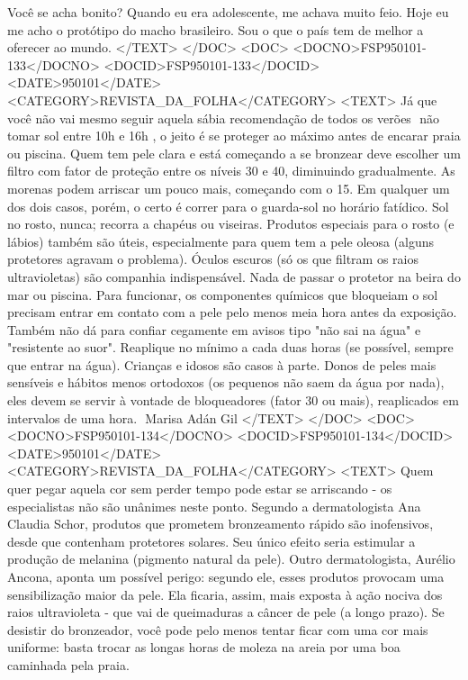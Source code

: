 Você se acha bonito?
Quando eu era adolescente, me achava muito feio. Hoje eu me acho o protótipo do macho brasileiro. Sou o que o país tem de melhor a oferecer ao mundo.
</TEXT>
</DOC>
<DOC>
<DOCNO>FSP950101-133</DOCNO>
<DOCID>FSP950101-133</DOCID>
<DATE>950101</DATE>
<CATEGORY>REVISTA_DA_FOLHA</CATEGORY>
<TEXT>
Já que você não vai mesmo seguir aquela sábia recomendação de todos os verões  não tomar sol entre 10h e 16h , o jeito é se proteger ao máximo antes de encarar praia ou piscina.
Quem tem pele clara e está começando a se bronzear deve escolher um filtro com fator de proteção entre os níveis 30 e 40, diminuindo gradualmente. As morenas podem arriscar um pouco mais, começando com o 15. Em qualquer um dos dois casos, porém, o certo é correr para o guarda-sol no horário fatídico.
Sol no rosto, nunca; recorra a chapéus ou viseiras. Produtos especiais para o rosto (e lábios) também são úteis, especialmente para quem tem a pele oleosa (alguns protetores agravam o problema). Óculos escuros (só os que filtram os raios ultravioletas) são companhia indispensável.
Nada de passar o protetor na beira do mar ou piscina. Para funcionar, os componentes químicos que bloqueiam o sol precisam entrar em contato com a pele pelo menos meia hora antes da exposição. Também não dá para confiar cegamente em avisos tipo "não sai na água" e "resistente ao suor". Reaplique no mínimo a cada duas horas (se possível, sempre que entrar na água).
Crianças e idosos são casos à parte. Donos de peles mais sensíveis e hábitos menos ortodoxos (os pequenos não saem da água por nada), eles devem se servir à vontade de bloqueadores (fator 30 ou mais), reaplicados em intervalos de uma hora.
 Marisa Adán Gil
</TEXT>
</DOC>
<DOC>
<DOCNO>FSP950101-134</DOCNO>
<DOCID>FSP950101-134</DOCID>
<DATE>950101</DATE>
<CATEGORY>REVISTA_DA_FOLHA</CATEGORY>
<TEXT>
Quem quer pegar aquela cor sem perder tempo pode estar se arriscando - os especialistas não são unânimes neste ponto. Segundo a dermatologista Ana Claudia Schor, produtos que prometem bronzeamento rápido são inofensivos, desde que contenham protetores solares. Seu único efeito seria estimular a produção de melanina (pigmento natural da pele). Outro dermatologista, Aurélio Ancona, aponta um possível perigo: segundo ele, esses produtos provocam uma sensibilização maior da pele. Ela ficaria, assim, mais exposta à ação nociva dos raios ultravioleta - que vai de queimaduras a câncer de pele (a longo prazo). Se desistir do bronzeador, você pode pelo menos tentar ficar com uma cor mais uniforme: basta trocar as longas horas de moleza na areia por uma boa caminhada pela praia.

